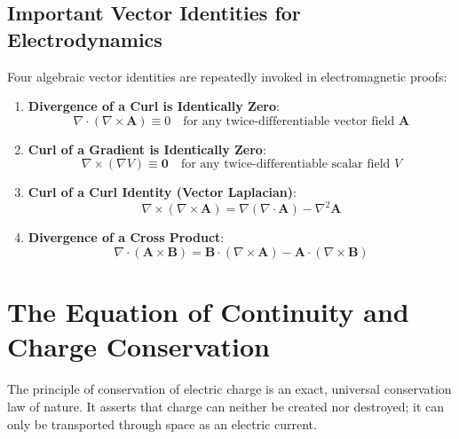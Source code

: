 \subsection{Important Vector Identities for Electrodynamics}
Four algebraic vector identities are repeatedly invoked in electromagnetic proofs:
\begin{enumerate}
    \item \textbf{Divergence of a Curl is Identically Zero}:
    \begin{equation}
        \nabla \cdot (\nabla \times \mathbf{A}) \equiv 0 \quad \text{for any twice-differentiable vector field } \mathbf{A}
    \end{equation}
    \item \textbf{Curl of a Gradient is Identically Zero}:
    \begin{equation}
        \nabla \times (\nabla V) \equiv \mathbf{0} \quad \text{for any twice-differentiable scalar field } V
    \end{equation}
    \item \textbf{Curl of a Curl Identity (Vector Laplacian)}:
    \begin{equation}
        \nabla \times (\nabla \times \mathbf{A}) = \nabla(\nabla \cdot \mathbf{A}) - \nabla^2 \mathbf{A}
    \end{equation}
    \item \textbf{Divergence of a Cross Product}:
    \begin{equation}
        \nabla \cdot (\mathbf{A} \times \mathbf{B}) = \mathbf{B} \cdot (\nabla \times \mathbf{A}) - \mathbf{A} \cdot (\nabla \times \mathbf{B})
    \end{equation}
\end{enumerate}

\section{The Equation of Continuity and Charge Conservation}
The principle of conservation of electric charge is an exact, universal conservation law of nature. It asserts that charge can neither be created nor destroyed; it can only be transported through space as an electric current.

